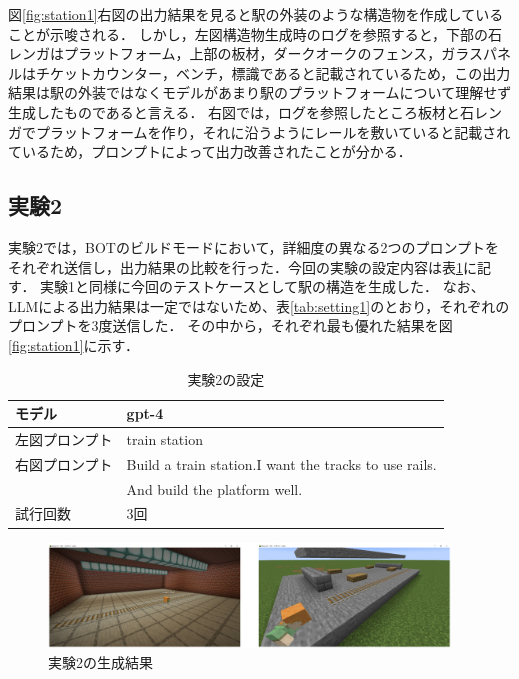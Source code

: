 図\ref{fig:station1}右図の出力結果を見ると駅の外装のような構造物を作成していることが示唆される．
しかし，左図構造物生成時のログを参照すると，下部の石レンガはプラットフォーム，上部の板材，ダークオークのフェンス，ガラスパネルはチケットカウンター，ベンチ，標識であると記載されているため，この出力結果は駅の外装ではなくモデルがあまり駅のプラットフォームについて理解せず生成したものであると言える．
右図では，ログを参照したところ板材と石レンガでプラットフォームを作り，それに沿うようにレールを敷いていると記載されているため，プロンプトによって出力改善されたことが分かる．

\subsection{実験2}\label{sec:ex2}
実験2では，BOTのビルドモードにおいて，詳細度の異なる2つのプロンプトをそれぞれ送信し，出力結果の比較を行った．今回の実験の設定内容は表\ref{tab:setting2}に記す．
実験1と同様に今回のテストケースとして駅の構造を生成した．
なお、LLMによる出力結果は一定ではないため、表\ref{tab:setting1}のとおり，それぞれのプロンプトを3度送信した．
その中から，それぞれ最も優れた結果を図\ref{fig:station1}に示す．
\begin{table}[H]
    \caption{実験2の設定}\label{tab:setting2}
    \centering
    \begin{tabular}{ll}
        \hline \hline
        モデル & gpt-4 \\
        \hline
        左図プロンプト & train station \\
        \hline
        右図プロンプト & Build a train station.I want the tracks to use rails. \\
        　 & And build the platform well. \\
        \hline
        試行回数 & 3回 \\
        \hline
    \end{tabular}
\end{table}

\begin{figure}[H]
    \centering
    \includegraphics[width=0.95\textwidth]{fig/train_station2.PNG}
    \caption{実験2の生成結果}
    \label{fig:station2}
\end{figure}

